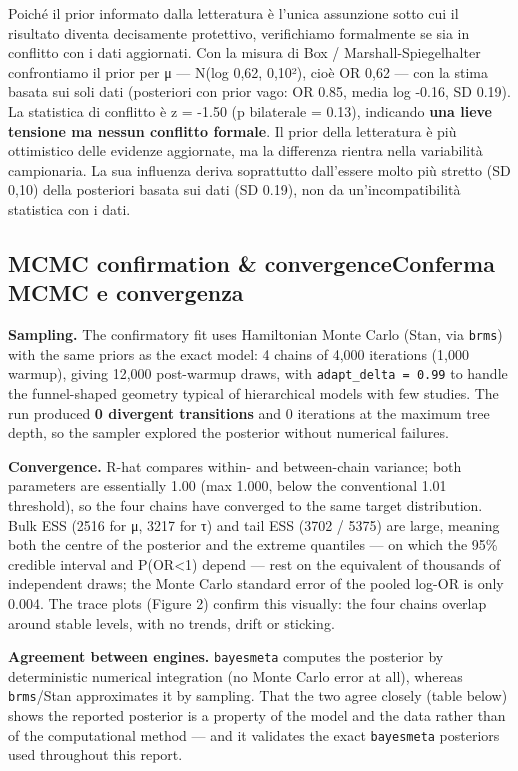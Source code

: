 \documentclass[
  letterpaper,
  DIV=11,
  numbers=noendperiod]{scrartcl}
\begin{document}
Poiché il prior informato dalla letteratura è l'unica assunzione sotto
cui il risultato diventa decisamente protettivo, verifichiamo
formalmente se sia in conflitto con i dati aggiornati. Con la misura di
Box / Marshall-Spiegelhalter confrontiamo il prior per μ --- N(log 0,62,
0,10²), cioè OR 0,62 --- con la stima basata sui soli dati (posteriori
con prior vago: OR 0.85, media log -0.16, SD 0.19). La statistica di
conflitto è z = -1.50 (p bilaterale = 0.13), indicando \textbf{una lieve
tensione ma nessun conflitto formale}. Il prior della letteratura è più
ottimistico delle evidenze aggiornate, ma la differenza rientra nella
variabilità campionaria. La sua influenza deriva soprattutto dall'essere
molto più stretto (SD 0,10) della posteriori basata sui dati (SD 0.19),
non da un'incompatibilità statistica con i dati.

\subsection{\texorpdfstring{{MCMC confirmation \& convergence}{Conferma
MCMC e
convergenza}}{MCMC confirmation \& convergenceConferma MCMC e convergenza}}\label{mcmc-confirmation-convergenceconferma-mcmc-e-convergenza}

\textbf{Sampling.} The confirmatory fit uses Hamiltonian Monte Carlo
(Stan, via \texttt{brms}) with the same priors as the exact model: 4
chains of 4,000 iterations (1,000 warmup), giving 12,000 post-warmup
draws, with \texttt{adapt\_delta\ =\ 0.99} to handle the funnel-shaped
geometry typical of hierarchical models with few studies. The run
produced \textbf{0 divergent transitions} and 0 iterations at the
maximum tree depth, so the sampler explored the posterior without
numerical failures.

\textbf{Convergence.} R-hat compares within- and between-chain variance;
both parameters are essentially 1.00 (max 1.000, below the conventional
1.01 threshold), so the four chains have converged to the same target
distribution. Bulk ESS (2516 for μ, 3217 for τ) and tail ESS (3702 /
5375) are large, meaning both the centre of the posterior and the
extreme quantiles --- on which the 95\% credible interval and
P(OR\textless1) depend --- rest on the equivalent of thousands of
independent draws; the Monte Carlo standard error of the pooled log-OR
is only 0.004. The trace plots (Figure 2) confirm this visually: the
four chains overlap around stable levels, with no trends, drift or
sticking.

\textbf{Agreement between engines.} \texttt{bayesmeta} computes the
posterior by deterministic numerical integration (no Monte Carlo error
at all), whereas \texttt{brms}/Stan approximates it by sampling. That
the two agree closely (table below) shows the reported posterior is a
property of the model and the data rather than of the computational
method --- and it validates the exact \texttt{bayesmeta} posteriors used
throughout this report.
\end{document}

